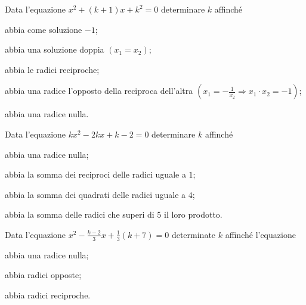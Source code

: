 \begin{esercizio}[\Ast]
 \label{ese:3.110}
Data l'equazione $x^{2} + (k + 1) x + k^{2} = 0$ determinare $k$ affinché
\begin{enumeratea}
\item abbia come soluzione $-1$;
\item abbia una soluzione doppia $(x_1 =x_2)$;
\item abbia le radici reciproche;
\item abbia una radice l'opposto della reciproca dell'altra $\left(x_1=-\frac{1}{x_2}\Rightarrow x_1 \cdot x_2=-1\right)$;
\item abbia una radice nulla.
\end{enumeratea}
\end{esercizio}

\begin{esercizio}[\Ast]
 \label{ese:3.111}
Data l'equazione $kx^{2}-2kx + k-2 = 0$ determinare $k$ affinché
\begin{enumeratea}
\item abbia una radice nulla;
\item abbia la somma dei reciproci delle radici uguale a $1$;
\item abbia la somma dei quadrati delle radici uguale a $4$;
\item abbia la somma delle radici che superi di $5$ il loro prodotto.
\end{enumeratea}
\end{esercizio}

\begin{esercizio}[\Ast] %
 \label{ese:3.112}
Data l'equazione $x^{2} -\frac{k-2}{3} x +\frac{1}{3}(k+7) = 0$ determinate $k$ affinché l'equazione
\begin{enumeratea}
\item abbia una radice nulla;
\item abbia radici opposte;
\item abbia radici reciproche.
\end{enumeratea}
\end{esercizio}

